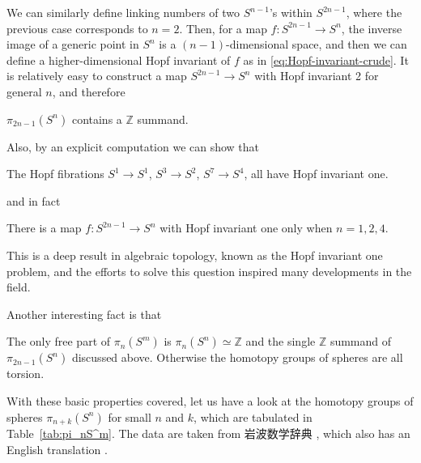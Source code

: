 \documentclass[12pt]{article}
\numberwithin{equation}{section}
\def\bZ{\mathbb{Z}}
\begin{document}
We can similarly define linking numbers of two $S^{n-1}$'s within $S^{2n-1}$,
where the previous case corresponds to $n=2$.
Then, for a map $f: S^{2n-1}\to S^{n}$,
the inverse image of a generic point in $S^n$ is a $(n-1)$-dimensional space,
and then we can define a higher-dimensional Hopf invariant of $f$ as in \eqref{eq:Hopf-invariant-crude}.
It is relatively easy to construct a map $S^{2n-1}\to S^n$ with Hopf invariant 2 for general $n$, and therefore
\begin{theorem}
  $\pi_{2n-1}(S^n)$ contains a  $\bZ$ summand.
\end{theorem}

Also, by an explicit computation we can show  that \begin{proposition}
The Hopf fibrations $S^1\to S^1$, $S^3\to S^2$, $S^7\to S^4$,
all have Hopf invariant one.
\end{proposition}
and in fact 
\begin{theorem}
There is a map $f:S^{2n-1}\to S^n$ with Hopf invariant one
only when $n=1,2,4$.
\end{theorem}
This is a deep result in algebraic topology, known as the Hopf invariant one problem,
and the efforts to solve this question inspired many developments in the field.


Another interesting fact is that 

\begin{theorem}
  The only free part of $\pi_n(S^m)$ is $\pi_n(S^n)\simeq \bZ$
  and the single $\bZ$ summand of $\pi_{2n-1}(S^n)$ discussed above.
  Otherwise the homotopy groups of spheres are all torsion.
\end{theorem}
  

With these basic properties covered,
let us have a look at the homotopy groups of spheres $\pi_{n+k}(S^n)$ 
for small $n$ and $k$, which are tabulated in Table~\ref{tab:pi_nS^m}.
The data are taken from 岩波数学辞典 \cite[付録, 公式 7, V]{Jiten},
which also has an English translation \cite{EDM}.
\end{document}
